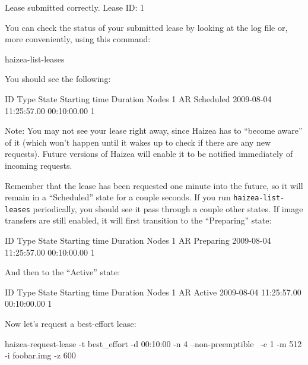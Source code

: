 \begin{wideshellverbatim}
Lease submitted correctly.
Lease ID: 1
\end{wideshellverbatim}

You can check the status of your submitted lease by looking at the log file or, more conveniently, using this command:

\begin{shellverbatim}
haizea-list-leases
\end{shellverbatim}

You should see the following:

\begin{wideshellverbatim}
 ID   Type          State      Starting time           Duration      Nodes  
 1    AR            Scheduled  2009-08-04 11:25:57.00  00:10:00.00   1        
\end{wideshellverbatim}

Note: You may not see your lease right away, since Haizea has to ``become aware'' of it (which won't happen until it wakes up to check if there are any new requests). Future versions of Haizea will enable it to be notified immediately of incoming requests.

Remember that the lease has been requested one minute into the future, so it will remain in a ``Scheduled'' state for a couple seconds. If you run \texttt{haizea-list-leases} periodically, you should see it pass through a couple other states. If image transfers are still enabled, it will first transition to the ``Preparing'' state:

\begin{wideshellverbatim}
 ID   Type          State      Starting time           Duration      Nodes  
 1    AR            Preparing  2009-08-04 11:25:57.00  00:10:00.00   1       
\end{wideshellverbatim}

And then to the ``Active'' state:

\begin{wideshellverbatim}
 ID   Type          State      Starting time           Duration      Nodes  
 1    AR            Active     2009-08-04 11:25:57.00  00:10:00.00   1       
\end{wideshellverbatim}

Now let's request a best-effort lease:

\begin{wideshellverbatim}
haizea-request-lease -t best_effort -d 00:10:00 -n 4 --non-preemptible \
                     -c 1 -m 512 -i foobar.img -z 600
\end{wideshellverbatim}

